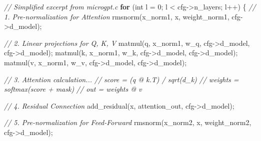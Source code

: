 \documentclass[
]{article}
\newenvironment{Shaded}{}{}
\newcommand{\CommentTok}[1]{\textcolor[rgb]{0.38,0.63,0.69}{\textit{#1}}}
\newcommand{\ControlFlowTok}[1]{\textcolor[rgb]{0.00,0.44,0.13}{\textbf{#1}}}
\newcommand{\DataTypeTok}[1]{\textcolor[rgb]{0.56,0.13,0.00}{#1}}
\newcommand{\DecValTok}[1]{\textcolor[rgb]{0.25,0.63,0.44}{#1}}
\newcommand{\NormalTok}[1]{#1}
\newcommand{\OperatorTok}[1]{\textcolor[rgb]{0.40,0.40,0.40}{#1}}
\begin{document}
\begin{Shaded}
\begin{Highlighting}[]
\CommentTok{// Simplified excerpt from microgpt.c}
\ControlFlowTok{for} \OperatorTok{(}\DataTypeTok{int}\NormalTok{ l }\OperatorTok{=} \DecValTok{0}\OperatorTok{;}\NormalTok{ l }\OperatorTok{\textless{}}\NormalTok{ cfg}\OperatorTok{{-}\textgreater{}}\NormalTok{n\_layers}\OperatorTok{;}\NormalTok{ l}\OperatorTok{++)} \OperatorTok{\{}
    \CommentTok{// 1. Pre{-}normalization for Attention}
\NormalTok{    rmsnorm}\OperatorTok{(}\NormalTok{x\_norm1}\OperatorTok{,}\NormalTok{ x}\OperatorTok{,}\NormalTok{ weight\_norm1}\OperatorTok{,}\NormalTok{ cfg}\OperatorTok{{-}\textgreater{}}\NormalTok{d\_model}\OperatorTok{);}
    
    \CommentTok{// 2. Linear projections for Q, K, V}
\NormalTok{    matmul}\OperatorTok{(}\NormalTok{q}\OperatorTok{,}\NormalTok{ x\_norm1}\OperatorTok{,}\NormalTok{ w\_q}\OperatorTok{,}\NormalTok{ cfg}\OperatorTok{{-}\textgreater{}}\NormalTok{d\_model}\OperatorTok{,}\NormalTok{ cfg}\OperatorTok{{-}\textgreater{}}\NormalTok{d\_model}\OperatorTok{);}
\NormalTok{    matmul}\OperatorTok{(}\NormalTok{k}\OperatorTok{,}\NormalTok{ x\_norm1}\OperatorTok{,}\NormalTok{ w\_k}\OperatorTok{,}\NormalTok{ cfg}\OperatorTok{{-}\textgreater{}}\NormalTok{d\_model}\OperatorTok{,}\NormalTok{ cfg}\OperatorTok{{-}\textgreater{}}\NormalTok{d\_model}\OperatorTok{);}
\NormalTok{    matmul}\OperatorTok{(}\NormalTok{v}\OperatorTok{,}\NormalTok{ x\_norm1}\OperatorTok{,}\NormalTok{ w\_v}\OperatorTok{,}\NormalTok{ cfg}\OperatorTok{{-}\textgreater{}}\NormalTok{d\_model}\OperatorTok{,}\NormalTok{ cfg}\OperatorTok{{-}\textgreater{}}\NormalTok{d\_model}\OperatorTok{);}
    
    \CommentTok{// 3. Attention calculation...}
    \CommentTok{// score = (q @ k.T) / sqrt(d\_k)}
    \CommentTok{// weights = softmax(score + mask)}
    \CommentTok{// out = weights @ v}
    
    \CommentTok{// 4. Residual Connection}
\NormalTok{    add\_residual}\OperatorTok{(}\NormalTok{x}\OperatorTok{,}\NormalTok{ attention\_out}\OperatorTok{,}\NormalTok{ cfg}\OperatorTok{{-}\textgreater{}}\NormalTok{d\_model}\OperatorTok{);}
    
    \CommentTok{// 5. Pre{-}normalization for Feed{-}Forward}
\NormalTok{    rmsnorm}\OperatorTok{(}\NormalTok{x\_norm2}\OperatorTok{,}\NormalTok{ x}\OperatorTok{,}\NormalTok{ weight\_norm2}\OperatorTok{,}\NormalTok{ cfg}\OperatorTok{{-}\textgreater{}}\NormalTok{d\_model}\OperatorTok{);}
    

\end{Highlighting}
\end{Shaded}
\end{document}
